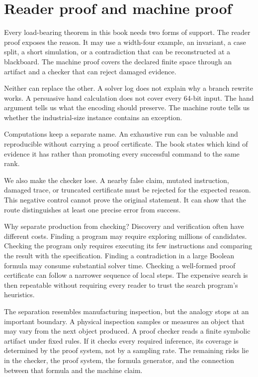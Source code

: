 \section{Reader proof and machine proof}

Every load-bearing theorem in this book needs two forms of support. The reader
proof exposes the reason. It may use a width-four example, an invariant, a
case split, a short simulation, or a contradiction that can be reconstructed
at a blackboard. The machine proof covers the declared finite space through an
artifact and a checker that can reject damaged evidence.

Neither can replace the other. A solver log does not explain why a branch
rewrite works. A persuasive hand calculation does not cover every 64-bit
input. The hand argument tells us what the encoding should preserve. The
machine route tells us whether the industrial-size instance contains an
exception.

Computations keep a separate name. An exhaustive run can be valuable and
reproducible without carrying a proof certificate. The book states which kind
of evidence it has rather than promoting every successful command to the same
rank.

We also make the checker lose. A nearby false claim, mutated instruction,
damaged trace, or truncated certificate must be rejected for the expected
reason. This negative control cannot prove the original statement. It can show
that the route distinguishes at least one precise error from success.

Why separate production from checking? Discovery and verification often have
different costs. Finding a program may require exploring millions of
candidates. Checking the program only requires executing its few instructions
and comparing the result with the specification. Finding a contradiction in a
large Boolean formula may consume substantial solver time. Checking a
well-formed proof certificate can follow a narrower sequence of local steps.
The expensive search is then repeatable without requiring every reader to
trust the search program's heuristics.

The separation resembles manufacturing inspection, but the analogy stops at
an important boundary. A physical inspection samples or measures an object
that may vary from the next object produced. A proof checker reads a finite
symbolic artifact under fixed rules. If it checks every required inference,
its coverage is determined by the proof system, not by a sampling rate. The
remaining risks lie in the checker, the proof system, the formula generator,
and the connection between that formula and the machine claim.

